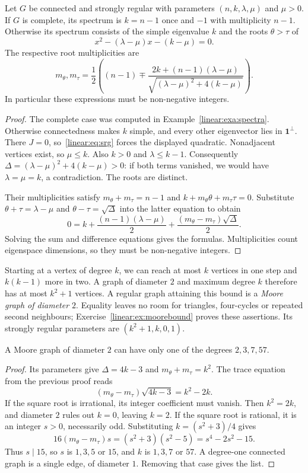\begin{theorem}\label{linear:thm:srg}
Let $G$ be connected and strongly regular with parameters $(n,k,\lambda,\mu)$ and $\mu>0$. If $G$ is complete, its spectrum is $k=n-1$ once and $-1$ with multiplicity $n-1$. Otherwise its spectrum consists of the simple eigenvalue $k$ and the roots $\theta>\tau$ of
\[
x^2-(\lambda-\mu)x-(k-\mu)=0.
\]
The respective root multiplicities are
\[
m_\theta,m_\tau=\frac12\left((n-1)\mp
\frac{2k+(n-1)(\lambda-\mu)}{\sqrt{(\lambda-\mu)^2+4(k-\mu)}}\right).
\]
In particular these expressions must be non-negative integers.
\end{theorem}
\begin{proof}
The complete case was computed in Example~\ref{linear:exa:spectra}. Otherwise connectedness makes $k$ simple, and every other eigenvector lies in $\mathbf1^\perp$. There $J=0$, so~\eqref{linear:eq:srg} forces the displayed quadratic. Nonadjacent vertices exist, so $\mu\le k$. Also $k>0$ and $\lambda\le k-1$. Consequently $\Delta=(\lambda-\mu)^2+4(k-\mu)>0$: if both terms vanished, we would have $\lambda=\mu=k$, a contradiction. The roots are distinct.

Their multiplicities satisfy $m_\theta+m_\tau=n-1$ and $k+m_\theta\theta+m_\tau\tau=0$. Substitute $\theta+\tau=\lambda-\mu$ and $\theta-\tau=\sqrt\Delta$ into the latter equation to obtain
\[
0=k+\frac{(n-1)(\lambda-\mu)}2+
\frac{(m_\theta-m_\tau)\sqrt\Delta}2.
\]
Solving the sum and difference equations gives the formulas. Multiplicities count eigenspace dimensions, so they must be non-negative integers.
\end{proof}

Starting at a vertex of degree $k$, we can reach at most $k$ vertices in one step and $k(k-1)$ more in two. A graph of diameter $2$ and maximum degree $k$ therefore has at most $k^2+1$ vertices. A regular graph attaining this bound is a \emph{Moore graph of diameter $2$}. Equality leaves no room for triangles, four-cycles or repeated second neighbours; Exercise~\ref{linear:ex:moorebound} proves these assertions. Its strongly regular parameters are $(k^2+1,k,0,1)$.

\begin{theorem}\label{linear:thm:moore}
A Moore graph of diameter $2$ can have only one of the degrees $2,3,7,57$.
\end{theorem}
\begin{proof}
Its parameters give $\Delta=4k-3$ and $m_\theta+m_\tau=k^2$. The trace equation from the previous proof reads
\[
(m_\theta-m_\tau)\sqrt{4k-3}=k^2-2k.
\]
If the square root is irrational, its integer coefficient must vanish. Then $k^2=2k$, and diameter $2$ rules out $k=0$, leaving $k=2$.
If the square root is rational, it is an integer $s>0$, necessarily odd. Substituting $k=(s^2+3)/4$ gives
\[
16(m_\theta-m_\tau)s=(s^2+3)(s^2-5)=s^4-2s^2-15.
\]
Thus $s\mid15$, so $s$ is $1,3,5$ or $15$, and $k$ is $1,3,7$ or $57$. A degree-one connected graph is a single edge, of diameter $1$. Removing that case gives the list.
\end{proof}

